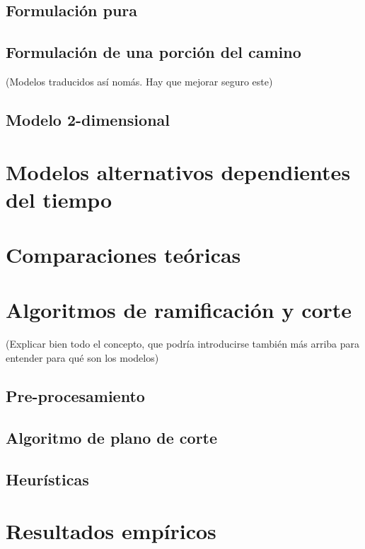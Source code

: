 \documentclass[10pt, a4paper]{article}
\begin{document}
\subsection{Formulación pura}

\subsection{Formulación de una porción del camino}

(Modelos traducidos así nomás. Hay que mejorar seguro este)

\subsection{Modelo 2-dimensional}

\section{Modelos alternativos dependientes del tiempo}

\section{Comparaciones teóricas}

\section{Algoritmos de ramificación y corte}

(Explicar bien todo el concepto, que podría introducirse también más arriba para entender para qué son los modelos)

\subsection{Pre-procesamiento}

\subsection{Algoritmo de plano de corte}

\subsection{Heurísticas}

\section{Resultados empíricos}
\end{document}
